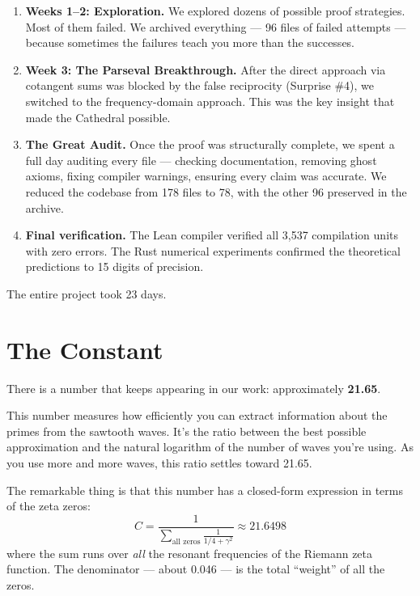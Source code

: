 \documentclass[12pt,a4paper]{article}
\begin{document}
\begin{enumerate}
  \item \textbf{Weeks 1--2: Exploration.} We explored dozens of possible
    proof strategies. Most of them failed. We archived everything ---
    96 files of failed attempts --- because sometimes the failures
    teach you more than the successes.

  \item \textbf{Week 3: The Parseval Breakthrough.} After the direct
    approach via cotangent sums was blocked by the false reciprocity
    (Surprise \#4), we switched to the frequency-domain approach.
    This was the key insight that made the Cathedral possible.

  \item \textbf{The Great Audit.} Once the proof was structurally
    complete, we spent a full day auditing every file --- checking
    documentation, removing ghost axioms, fixing compiler warnings,
    ensuring every claim was accurate. We reduced the codebase from
    178 files to 78, with the other 96 preserved in the archive.

  \item \textbf{Final verification.} The Lean compiler verified all
    3,537 compilation units with zero errors. The Rust numerical
    experiments confirmed the theoretical predictions to 15 digits
    of precision.
\end{enumerate}

The entire project took 23 days.

\section*{The Constant}

There is a number that keeps appearing in our work: approximately
\textbf{21.65}.

This number measures how efficiently you can extract information about
the primes from the sawtooth waves. It's the ratio between the best
possible approximation and the natural logarithm of the number of
waves you're using. As you use more and more waves, this ratio
settles toward 21.65.

The remarkable thing is that this number has a closed-form expression
in terms of the zeta zeros:
\[
  C = \frac{1}{\displaystyle\sum_{\text{all zeros}} \frac{1}{1/4 + \gamma^2}}
  \approx 21.6498
\]
where the sum runs over \emph{all} the resonant frequencies of the Riemann
zeta function. The denominator --- about 0.046 --- is the total ``weight''
of all the zeros.
\end{document}
